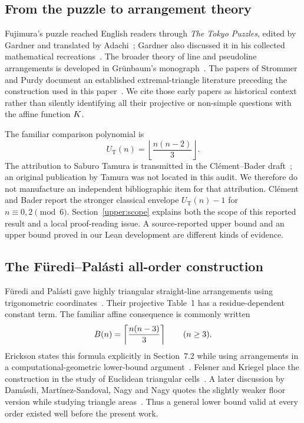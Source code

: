 \subsection{From the puzzle to arrangement theory}

Fujimura's puzzle reached English readers through \emph{The Tokyo Puzzles}, edited by Gardner and translated by Adachi~\citep{fujimura1978}; Gardner also discussed it in his collected mathematical recreations~\citep{gardner1983}. The broader theory of line and pseudoline arrangements is developed in Gr\"unbaum's monograph~\citep{grunbaum1972}. The papers of Strommer and Purdy document an established extremal-triangle literature preceding the construction used in this paper~\citep{strommer1977,purdy1979,purdy1980}. We cite those early papers as historical context rather than silently identifying all their projective or non-simple questions with the affine function $K$.

The familiar comparison polynomial is
\begin{equation}
 U_{\mathrm T}(n)=\left\lfloor\frac{n(n-2)}3\right\rfloor.
 \label{lit:tamura}
\end{equation}
The attribution to Saburo Tamura is transmitted in the Cl\'ement--Bader draft~\citep{clementbader2007}; an original publication by Tamura was not located in this audit. We therefore do not manufacture an independent bibliographic item for that attribution. Cl\'ement and Bader report the stronger classical envelope $U_{\mathrm T}(n)-1$ for $n\equiv0,2\pmod6$. Section~\ref{upper:scope} explains both the scope of this reported result and a local proof-reading issue. A source-reported upper bound and an upper bound proved in our Lean development are different kinds of evidence.

\subsection{The F\"uredi--Pal\'asti all-order construction}

F\"uredi and Pal\'asti gave highly triangular straight-line arrangements using trigonometric coordinates~\citep{furedipalasti1984}. Their projective Table~1 has a residue-dependent constant term. The familiar affine consequence is commonly written
\begin{equation}
 B(n)=\left\lceil\frac{n(n-3)}3\right\rceil\qquad(n\ge3).
 \label{lit:baseline}
\end{equation}
Erickson states this formula explicitly in Section~7.2 while using arrangements in a computational-geometric lower-bound argument~\citep{erickson1999}. Felsner and Kriegel place the construction in the study of Euclidean triangular cells~\citep{felsnerkriegel1999}. A later discussion by Dam\'asdi, Mart\'inez-Sandoval, Nagy and Nagy quotes the slightly weaker floor version while studying triangle areas~\citep{damasdi2020}. Thus a general lower bound valid at every order existed well before the present work.

